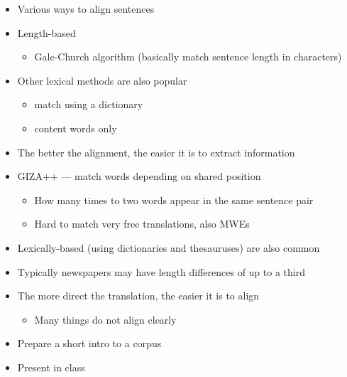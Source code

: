 \documentclass[a4paper,landscape,headrule,footrule,xetex]{foils}
\begin{document}
\begin{itemize}
\item Various ways to align sentences
\item Length-based
  \begin{itemize}
  \item Gale-Church algorithm (basically match sentence length in characters)
  \end{itemize}
\item Other lexical methods are also popular
  \begin{itemize}
  \item match using a dictionary
  \item content words only
  \end{itemize}
\item The better the alignment, the easier it is to extract information
\end{itemize}

\begin{itemize}
\item GIZA++ --- match words depending on shared position
  \begin{itemize}
  \item How many times to two words appear in the same sentence pair
  \item Hard to match very free translations, also MWEs
  \end{itemize}
\item Lexically-based (using dictionaries and thesauruses) are also common
\item Typically newspapers may have length differences of up to a third
\item The more direct the translation, the easier it is to align 
  \begin{itemize}
  \item Many things do not align clearly
  \end{itemize}
\end{itemize}


\begin{itemize}
\item Prepare a short intro to a corpus
\item Present in class
\end{itemize}






\end{document}
